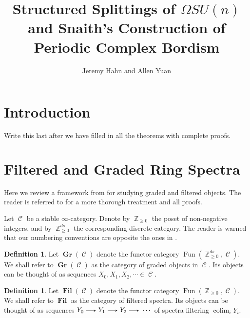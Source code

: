 \documentclass[11pt]{article}
\theoremstyle{definition}
\newtheorem{dfn}[nul]{Definition}
\theoremstyle{plain}
\numberwithin{equation}{nul}
\theoremstyle{TheoremNum}
\DeclareMathOperator*{\colim}{\text{colim}}
\DeclareMathOperator{\C}{\mathcal{C}}
\DeclareMathOperator{\Z}{\mathbb{Z}}
\DeclareMathOperator{\Gr}{\textbf{Gr}}
\DeclareMathOperator{\Fil}{\textbf{Fil}}
\DeclareMathOperator{\Fun}{\text{Fun}}
\renewcommand{\to}{\ \tikz[baseline]\draw[>=stealth,->](0,0.5ex)--(0.5,0.5ex);\ }
\begin{document}
\title{Structured Splittings of $\Omega SU(n)$ and Snaith's Construction of Periodic Complex Bordism}

\author{Jeremy Hahn and Allen Yuan}



\maketitle
\tableofcontents



\section{Introduction}

Write this last after we have filled in all the theorems with complete proofs.

\section{Filtered and Graded Ring Spectra}

Here we review a framework from \cite{LurieRot} for studying graded and filtered objects.  The reader is referred to \cite{LurieRot} for a more thorough treatment and all proofs.  

Let $\C$ be a stable $\infty$-category.  Denote by $\Z_{\geq 0}$ the poset of non-negative integers, and by $\Z_{\geq 0}^{ds}$ the corresponding discrete category.  The reader is warned that our numbering conventions are opposite the ones in \cite{LurieRot}.  
\begin{dfn} 
Let $\Gr(\C)$ denote the functor category $\Fun(\Z_{\geq 0}^{ds}, \C).$  We shall refer to $\Gr(\C)$ as the category of graded objects in $\C$.  Its objects can be thought of as sequences $X_0, X_1,X_2,\cdots \in \C$.  
\end{dfn}
\begin{dfn} 
Let $\Fil(\C)$ denote the functor category $\Fun(\Z_{\geq 0}, \C).$  We shall refer to $\Fil$ as the category of filtered spectra.  Its objects can be thought of as sequences $Y_0\to Y_1\to Y_2 \to \cdots$ of spectra filtering $\colim_i Y_i$.  
\end{dfn}
\end{document}
